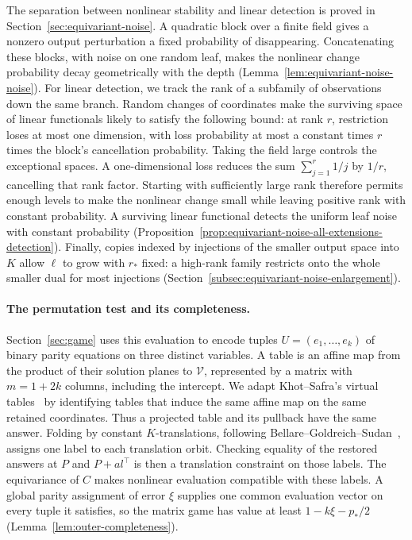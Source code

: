 The separation between nonlinear stability and linear detection is proved
in Section~\ref{sec:equivariant-noise}. A quadratic block over a finite field gives
a nonzero output perturbation a fixed probability of disappearing.
Concatenating these blocks, with noise on one random leaf, makes the
nonlinear change probability decay geometrically with the depth
(Lemma~\ref{lem:equivariant-noise-noise}). For linear detection, we track the rank
of a subfamily of observations down the same branch. Random changes of
coordinates make the surviving space of linear functionals likely to satisfy the
following bound: at rank \(r\), restriction loses at most one dimension,
with loss probability at most a constant times \(r\) times the block's
cancellation probability. Taking the field large controls the exceptional
spaces. A one-dimensional loss reduces the sum
\(\sum_{j=1}^r1/j\) by \(1/r\), cancelling that rank factor.
Starting with sufficiently large rank therefore permits enough levels
to make the nonlinear change small while leaving positive rank with
constant probability. A surviving linear functional detects the uniform leaf
noise with constant probability
(Proposition~\ref{prop:equivariant-noise-all-extensions-detection}). Finally, copies
indexed by injections of the smaller output space into \(K\) allow
\(\ell\) to grow with \(r_*\) fixed: a high-rank family restricts onto
the whole smaller dual for most injections
(Section~\ref{subsec:equivariant-noise-enlargement}).

\paragraph{The permutation test and its completeness.}
Section~\ref{sec:game} uses this evaluation to encode tuples
\(U=(e_1,\ldots,e_k)\) of binary parity equations on three distinct
variables. A table is an affine map from the product of their solution
planes to \(\mathcal V\), represented by a matrix with \(m=1+2k\)
columns, including the intercept. We adapt Khot--Safra's virtual
tables~\cite[Section~1.1]{KS13} by identifying tables that induce the
same affine map on the same retained coordinates. Thus a projected
table and its pullback have the same answer. Folding by constant
\(K\)-translations, following Bellare--Goldreich--Sudan~\cite[Section~3.3]{BGS98},
assigns one label to each translation orbit. Checking equality of the
restored answers at \(P\) and \(P+a l^\top\) is then a translation
constraint on those labels. The equivariance of \(C\) makes nonlinear
evaluation compatible with these labels. A global parity assignment of error \(\xi\) supplies
one common evaluation vector on every tuple it satisfies, so the matrix
game has value at least \(1-k\xi-p_*/2\)
(Lemma~\ref{lem:outer-completeness}).

